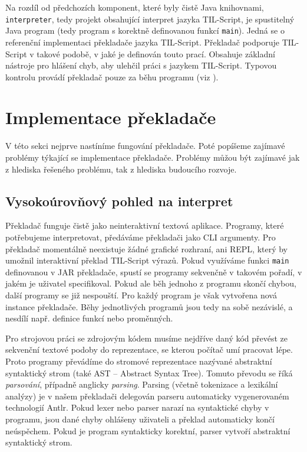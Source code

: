Na rozdíl od předchozích komponent, které byly čistě Java knihovnami, \lstinline{interpreter}, tedy
projekt obsahující interpret jazyka TIL-Script, je spustitelný
Java program (tedy program s korektně definovanou funkcí \lstinline{main}). Jedná se o referenční
implementaci překladače jazyka TIL-Script. Překladač podporuje TIL-Script v takové podobě, v jaké je
definován touto prací. Obsahuje základní nástroje pro hlášení chyb, aby ulehčil práci
s jazykem TIL-Script. Typovou kontrolu provádí překladač pouze za běhu programu
(viz ).

\section{Implementace překladače}

V této sekci nejprve nastíníme fungování překladače. Poté popíšeme zajímavé problémy týkající se
implementace překladače. Problémy můžou být zajímavé jak z hlediska řešeného problému, tak
z hlediska budoucího rozvoje.

\subsection{Vysokoúrovňový pohled na interpret}

Překladač funguje čistě jako neinteraktivní textová aplikace. Programy, které potřebujeme
interpretovat, předáváme překladači jako CLI argumenty. Pro překladač momentálně neexistuje žádné
grafické rozhraní, ani REPL, který by umožnil interaktivní překlad TIL-Script výrazů. Pokud
využíváme funkci \lstinline{main} definovanou v JAR překladače, spustí se programy sekvenčně
v takovém pořadí, v jakém je uživatel specifikoval. Pokud ale běh jednoho z programu skončí chybou,
další programy se již nespouští. Pro každý program je však vytvořena nová instance překladače. Běhy
jednotlivých programů jsou tedy na sobě nezávislé, a nesdílí např. definice funkcí nebo proměnných.

Pro strojovou práci se zdrojovým kódem musíme nejdříve daný kód převést ze sekvenční textové podoby
do reprezentace, se kterou počítač umí pracovat lépe. Proto programy převádíme do stromové
reprezentace nazývané abstraktní syntaktický strom
(také AST -- Abstract Syntax Tree)\cite{benes-compilers}. Tomuto převodu se říká \textit{parsování},
případně anglicky \textit{parsing}. Parsing (včetně tokenizace a
lexikální analýzy) je v našem překladači delegován parseru automaticky vygenerovaném technologií
Antlr. Pokud lexer nebo parser narazí na syntaktické chyby v programu, jsou dané chyby ohlášeny
uživateli a překlad automaticky končí neúspěchem. Pokud je program syntakticky korektní,
parser vytvoří abstraktní syntaktický strom.

